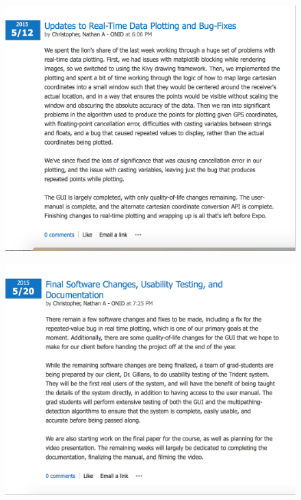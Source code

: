 \documentclass[12pt]{article}
\begin{document}
\begin{figure}[H]
\centering
\includegraphics[scale=0.5]{blog_posts/2015_5_12.png}
\label{fig:my_label}
\end{figure}

\begin{figure}[H]
\centering
\includegraphics[scale=0.5]{blog_posts/2015_5_20.png}
\label{fig:my_label}
\end{figure}
\end{document}

